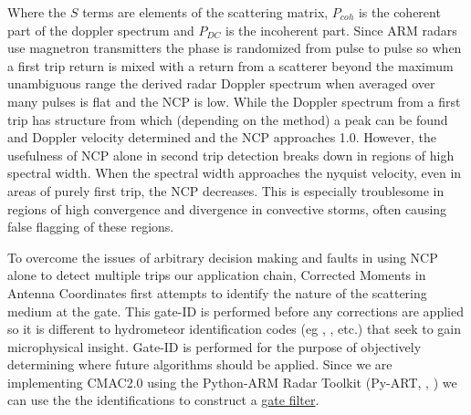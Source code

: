 \documentclass[twocol]{ametsoc}
\begin{document}
Where the $S$ terms are elements of the scattering matrix, $P_{coh}$ is the coherent part of the doppler spectrum and $P_{DC}$ is the incoherent part.
 Since ARM radars use magnetron transmitters the phase is randomized from pulse to pulse so when a first trip return is mixed with a return from a scatterer
  beyond the maximum unambiguous range the derived radar Doppler spectrum when averaged over many pulses is flat and the NCP is low. While the 
  Doppler spectrum from a first trip has structure from which (depending on the method) a peak can be found and Doppler velocity determined and the NCP
   approaches 1.0. However, the usefulness of NCP alone in second trip detection breaks down in regions of high spectral width. When the spectral width
    approaches the nyquist velocity, even in areas of purely first trip, the NCP decreases. This is especially troublesome in regions of high convergence 
    and divergence in convective storms, often causing false flagging of these regions. 

To overcome the issues of arbitrary decision making and faults in using NCP alone to detect multiple trips our application chain, Corrected Moments in
 Antenna Coordinates first attempts to identify the nature of the scattering medium at the gate. This gate-ID is performed before any corrections are
  applied so it is different to hydrometeor identification codes (eg \cite{dolan_theory-based_2009}, \cite{wen_cluster-based_2015}, \cite{al-sakka_new_2013} etc.) 
  that seek to gain microphysical insight. Gate-ID is performed for the purpose of objectively determining where future algorithms should be applied. 
  Since we are implementing CMAC2.0 using the Python-ARM Radar Toolkit (Py-ART, \cite{heistermann_emergence_2014}, \cite{pyartjors}) we can use the the
   identifications to construct a \href{https://github.com/ARM-DOE/pyart/blob/master/pyart/filters/gatefilter.py#L111 }{gate filter}.
\end{document}
